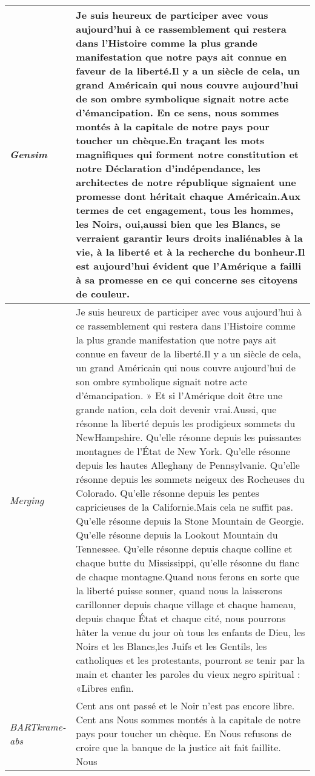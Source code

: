 \begin{center}
\begin{longtable}{|p{3cm}|p{13cm}|}
\hline
\textit{Gensim} & Je suis heureux de participer avec vous aujourd'hui à ce rassemblement qui restera dans l'Histoire comme la plus grande manifestation que notre pays ait connue en faveur de la liberté.Il y a un siècle de cela, un grand Américain qui nous couvre aujourd'hui de son ombre symbolique signait notre acte d'émancipation. En ce sens, nous sommes montés à la capitale de notre pays pour toucher un chèque.En traçant les mots magnifiques qui forment notre constitution et notre Déclaration d'indépendance, les architectes de notre république signaient une promesse dont héritait chaque Américain.Aux termes de cet engagement, tous les hommes, les Noirs, oui,aussi bien que les Blancs, se verraient garantir leurs droits inaliénables à la vie, à la liberté et à la recherche du bonheur.Il est aujourd'hui évident que l'Amérique a failli à sa promesse en ce qui concerne ses citoyens de couleur. \\
\hline
\textit{Merging} & Je suis heureux de participer avec vous aujourd'hui à ce rassemblement qui restera dans l'Histoire comme la plus grande manifestation que notre pays ait connue en faveur de la liberté.Il y a un siècle de cela, un grand Américain qui nous couvre aujourd'hui de son ombre symbolique signait notre acte d'émancipation. » Et si l'Amérique doit être une grande nation, cela doit devenir vrai.Aussi, que résonne la liberté depuis les prodigieux sommets du NewHampshire. Qu'elle résonne depuis les puissantes montagnes de l'État de New York. Qu’elle résonne depuis les hautes Alleghany de Pennsylvanie. Qu'elle résonne depuis les sommets neigeux des Rocheuses du Colorado. Qu'elle résonne depuis les pentes capricieuses de la Californie.Mais cela ne suffit pas. Qu'elle résonne depuis la Stone Mountain de Georgie. Qu'elle résonne depuis la Lookout Mountain du Tennessee. Qu'elle résonne depuis chaque colline et chaque butte du Mississippi, qu'elle résonne du flanc de chaque montagne.Quand nous ferons en sorte que la liberté puisse sonner, quand nous la laisserons carillonner depuis chaque village et chaque hameau, depuis chaque État et chaque cité, nous pourrons hâter la venue du jour où tous les enfants de Dieu, les Noirs et les Blancs,les Juifs et les Gentils, les catholiques et les protestants, pourront se tenir par la main et chanter les paroles du vieux negro spiritual : «Libres enfin.  \\
\hline
\textit{BARTkrame-abs} & Cent ans ont passé et le Noir n’est pas encore libre. Cent ans
Nous sommes montés à la capitale de notre pays pour toucher un chèque. En
Nous refusons de croire que la banque de la justice ait fait faillite. Nous

\end{longtable}
\end{center}
